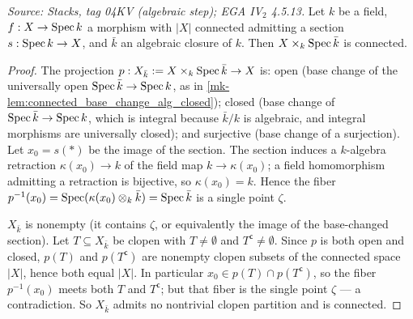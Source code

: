 \begin{lemma}\label{mk-lem:connected_base_change_algebraic_closure}
  \leanok

  \textit{Source: Stacks, tag 04KV (algebraic step); EGA IV\(_2\) 4.5.13.}
  Let \(k\) be a field, \(f : X \to \operatorname{Spec} k\) a morphism with \(|X|\)
  connected admitting a section \(s : \operatorname{Spec} k \to X\), and
  \(\bar k\) an algebraic closure of \(k\). Then
  \(X \times_k \operatorname{Spec} \bar k\) is connected.
\end{lemma}
\begin{proof}
  \leanok
  The projection \(p : X_{\bar k} := X \times_k \operatorname{Spec} \bar k \to X\) is:
  open (base change of the universally open \(\operatorname{Spec} \bar k \to \operatorname{Spec}
  k\), as in \ref{mk-lem:connected_base_change_alg_closed}); closed
  (base change of \(\operatorname{Spec} \bar k \to \operatorname{Spec} k\), which is integral
  because \(\bar k / k\) is algebraic, and integral morphisms are
  universally closed); and surjective (base change of a surjection).
  Let \(x_0 = s(\ast)\) be the image of the section. The section
  induces a \(k\)-algebra retraction \(\kappa(x_0) \to k\) of the field
  map \(k \to \kappa(x_0)\); a field homomorphism admitting a
  retraction is bijective, so \(\kappa(x_0) = k\). Hence the fiber
  \(p^{-1}(x_0) = \operatorname{Spec}(\kappa(x_0) \otimes_k \bar k) = \operatorname{Spec} \bar k\)
  is a single point \(\zeta\).

  \(X_{\bar k}\) is nonempty (it contains \(\zeta\), or equivalently
  the image of the base-changed section). Let \(T \subseteq
  X_{\bar k}\) be clopen with \(T \neq \emptyset\) and
  \(T^{\mathsf c} \neq \emptyset\). Since \(p\) is both open and
  closed, \(p(T)\) and \(p(T^{\mathsf c})\) are nonempty clopen subsets
  of the connected space \(|X|\), hence both equal \(|X|\). In
  particular \(x_0 \in p(T) \cap p(T^{\mathsf c})\), so the fiber
  \(p^{-1}(x_0)\) meets both \(T\) and \(T^{\mathsf c}\); but that
  fiber is the single point \(\zeta\) — a contradiction. So
  \(X_{\bar k}\) admits no nontrivial clopen partition and is
  connected.
\end{proof}

